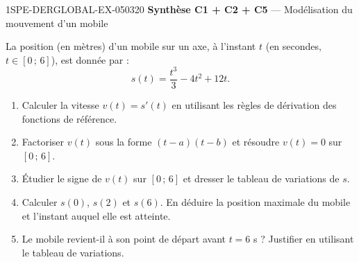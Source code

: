 \begin{exercice}{1SPE-DERGLOBAL-EX-050}{3}{20}
\textbf{Synthèse C1 + C2 + C5} — Modélisation du mouvement d'un mobile

La position (en mètres) d'un mobile sur un axe, à l'instant $t$ (en secondes,
$t \in \left[0\,;\,6\right]$), est donnée par :
\[
  s(t) = \frac{t^3}{3} - 4t^2 + 12t.
\]

\begin{enumerate}
  \item Calculer la vitesse $v(t) = s'(t)$ en utilisant les règles de dérivation
        des fonctions de référence.
  \item Factoriser $v(t)$ sous la forme $(t - a)(t - b)$ et résoudre $v(t) = 0$
        sur $\left[0\,;\,6\right]$.
  \item Étudier le signe de $v(t)$ sur $\left[0\,;\,6\right]$ et dresser le tableau
        de variations de $s$.
  \item Calculer $s(0)$, $s(2)$ et $s(6)$. En déduire la position maximale du mobile
        et l'instant auquel elle est atteinte.
  \item Le mobile revient-il à son point de départ avant $t = 6$ s ?
        Justifier en utilisant le tableau de variations.
\end{enumerate}
\end{exercice}
